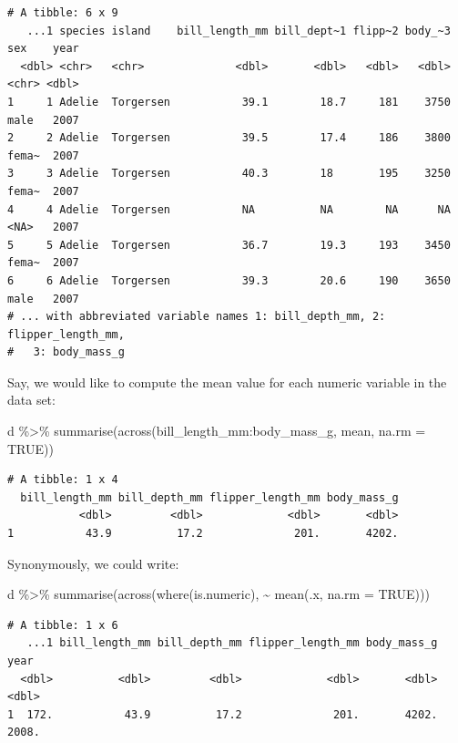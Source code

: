 \documentclass[
  letterpaper,
  DIV=11,
  numbers=noendperiod]{scrreprt}
\newenvironment{Shaded}{\begin{snugshade}}{\end{snugshade}}
\newcommand{\AttributeTok}[1]{\textcolor[rgb]{0.40,0.45,0.13}{#1}}
\newcommand{\ConstantTok}[1]{\textcolor[rgb]{0.56,0.35,0.01}{#1}}
\newcommand{\FunctionTok}[1]{\textcolor[rgb]{0.28,0.35,0.67}{#1}}
\newcommand{\NormalTok}[1]{\textcolor[rgb]{0.00,0.23,0.31}{#1}}
\newcommand{\SpecialCharTok}[1]{\textcolor[rgb]{0.37,0.37,0.37}{#1}}
\theoremstyle{definition}
\theoremstyle{definition}
\theoremstyle{remark}
\begin{document}
\begin{verbatim}
# A tibble: 6 x 9
   ...1 species island    bill_length_mm bill_dept~1 flipp~2 body_~3 sex    year
  <dbl> <chr>   <chr>              <dbl>       <dbl>   <dbl>   <dbl> <chr> <dbl>
1     1 Adelie  Torgersen           39.1        18.7     181    3750 male   2007
2     2 Adelie  Torgersen           39.5        17.4     186    3800 fema~  2007
3     3 Adelie  Torgersen           40.3        18       195    3250 fema~  2007
4     4 Adelie  Torgersen           NA          NA        NA      NA <NA>   2007
5     5 Adelie  Torgersen           36.7        19.3     193    3450 fema~  2007
6     6 Adelie  Torgersen           39.3        20.6     190    3650 male   2007
# ... with abbreviated variable names 1: bill_depth_mm, 2: flipper_length_mm,
#   3: body_mass_g
\end{verbatim}

Say, we would like to compute the mean value for each numeric variable
in the data set:

\begin{Shaded}
\begin{Highlighting}[]
\NormalTok{d }\SpecialCharTok{\%\textgreater{}\%} 
  \FunctionTok{summarise}\NormalTok{(}\FunctionTok{across}\NormalTok{(bill\_length\_mm}\SpecialCharTok{:}\NormalTok{body\_mass\_g, mean, }\AttributeTok{na.rm =} \ConstantTok{TRUE}\NormalTok{))}
\end{Highlighting}
\end{Shaded}

\begin{verbatim}
# A tibble: 1 x 4
  bill_length_mm bill_depth_mm flipper_length_mm body_mass_g
           <dbl>         <dbl>             <dbl>       <dbl>
1           43.9          17.2              201.       4202.
\end{verbatim}

Synonymously, we could write:

\begin{Shaded}
\begin{Highlighting}[]
\NormalTok{d }\SpecialCharTok{\%\textgreater{}\%} 
  \FunctionTok{summarise}\NormalTok{(}\FunctionTok{across}\NormalTok{(}\FunctionTok{where}\NormalTok{(is.numeric), }\SpecialCharTok{\textasciitilde{}} \FunctionTok{mean}\NormalTok{(.x, }\AttributeTok{na.rm =} \ConstantTok{TRUE}\NormalTok{)))}
\end{Highlighting}
\end{Shaded}

\begin{verbatim}
# A tibble: 1 x 6
   ...1 bill_length_mm bill_depth_mm flipper_length_mm body_mass_g  year
  <dbl>          <dbl>         <dbl>             <dbl>       <dbl> <dbl>
1  172.           43.9          17.2              201.       4202. 2008.
\end{verbatim}
\end{document}

